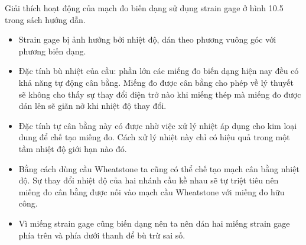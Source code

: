 Giải thích hoạt động của mạch đo biến dạng sử dụng strain gage ở hình 10.5 trong sách hướng dẫn.
\begin{itemize}
	\item Strain gage bị ảnh hưởng bởi nhiệt độ, dán theo phương vuông góc với phương biến dạng.
	\item Đặc tính bù nhiệt của cầu: phần lớn các miếng đo biến dạng hiện nay đều có khả năng tự động cân bằng. Miếng đo được cân bằng cho phép về lý thuyết sẽ không cho thấy sự thay đổi điện trở nào khi miếng thép mà miếng đo được dán lên sẽ giãn nở khi nhiệt độ thay đổi.
	\item Đặc tính tự cân bằng này có được nhờ việc xử lý nhiệt áp dụng cho kim loại dung để chế tạo miếng đo. Cách xử lý nhiệt này chỉ có hiệu quả trong một tầm nhiệt độ giới hạn nào đó.
	\item Bằng cách dùng cầu Wheatstone ta cũng có thể chế tạo mạch cân bằng nhiệt độ. Sự thay đổi nhiệt độ của hai nhánh cầu kề nhau sẽ tự triệt tiêu nên miếng đo cân bằng được nối vào mạch cầu Wheatstone với miếng đo hữu công.
	\item Vì miếng strain gage cũng biến dạng nên ta nên dán hai miếng strain gage phía trên và phía dưới thanh để bù trừ sai số.
\end{itemize}